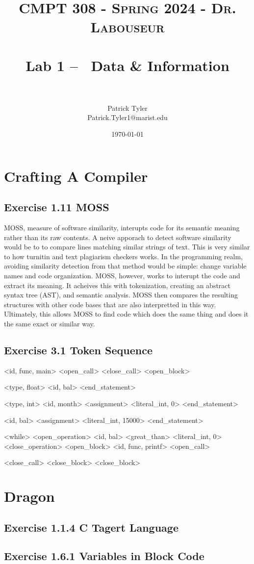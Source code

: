 \documentclass[letterpaper, 10pt]{article}
\title{	
   \normalfont \normalsize 
   \textsc{CMPT 308 - Spring 2024 - Dr. Labouseur} \\[10pt] %
   \horrule{0.5pt} \\[0.25cm] 	%
   \huge Lab 1 -- ~Data \& Information\\     	    %
   \horrule{0.5pt} \\[0.25cm] 	%
}
\author{Patrick Tyler \\ \normalsize Patrick.Tyler1@marist.edu}
\date{\normalsize\today} 	%
\begin{document}
\maketitle %


\section{Crafting A Compiler}
\subsection{Exercise 1.11 MOSS}
MOSS, measure of software similarity, interupts code for its
   semantic meaning rather than its raw contents.
A neive apporach to detect software similarity would be to
   to compare lines matching similar strings of text.
This is very similar to how turnitin and text plagiarism
   checkers works.
In the programming realm, avoiding similarity detection from that
   method would be simple: change variable names and code organization.
MOSS, however, works to interupt the code and extract its meaning.
It acheives this with tokenization, creating an abstract syntax tree
   (AST), and semantic analysis.
MOSS then compares the resulting structures with other code bases
   that are also interpretted in this way.
Ultimately, this allows MOSS to find code which does the same thing
   and does it the same exact or similar way.
\subsection{Exercise 3.1 Token Sequence}
<id, func, main>
<open_call>
<close_call>
<open_block>

<type, float>
<id, bal>
<end_statement>

<type, int>
<id, month>
<assignment>
<literal_int, 0>
<end_statement>

<id, bal>
<assignment>
<literal_int, 15000>
<end_statement>

<while>
<open_operation>
<id, bal>
<great_than>
<literal_int, 0>
<close_operation>
<open_block>
<id, func, printf>
<open_call>

<close_call>
<close_block>
<close_block>

\section{Dragon}
\subsection{Exercise 1.1.4 C Tagert Language}
\subsection{Exercise 1.6.1 Variables in Block Code}
\end{document}
